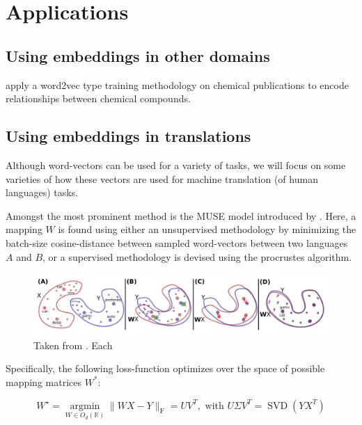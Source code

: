 \documentclass[a4paper,12pt,twoside,openright]{report}
\begin{document}
\chapter{Applications}\label{AppendixApplication}

\section{Using embeddings in other domains}

\cite{tshitoyan19} apply a word2vec type training methodology on chemical publications to encode relationships between chemical compounds.


\section{Using embeddings in translations}


Although word-vectors can be used for a variety of tasks, we will focus on some varieties of how these vectors are used for machine translation (of human languages) tasks.

Amongst the most prominent method is the MUSE model introduced by \cite{conneau17}.
Here, a mapping $W$ is found using either an unsupervised methodology by minimizing the batch-size cosine-distance between sampled word-vectors between two languages $A$ and $B$, or a supervised methodology is devised using the procrustes algorithm.

\begin{figure}[h]
	\center
  \includegraphics[width=\linewidth]{./assets/relatedwork/muse.png}
  \caption{Taken from \cite{conneau17}. Each }
  \label{fig:muse_translation}
\end{figure}

Specifically, the following loss-function optimizes over the space of possible mapping matrices $W^*$:

\begin{equation}
W^{\star}=\underset{W \in O_{d}(\mathbb{R})}{\operatorname{argmin}}\|W X-Y\|_{\mathrm{F}}=U V^{T}, \text { with } U \Sigma V^{T}=\operatorname{SVD}\left(Y X^{T}\right)
\end{equation}
\end{document}
